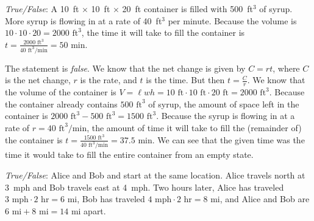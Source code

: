 \documentclass[11pt,letterpaper]{article}
\begin{document}
\quizsol \textit{True/False}: A 10~ft $\times$ 10~ft $\times$ 20~ft container is filled with 500~ft$^3$ of syrup. More syrup is flowing in at a rate of 40~ft$^3$ per minute. Because the volume is $10 \cdot 10 \cdot 20= 2000 \text{ ft}^3$, the time it will take to fill the container is $t= \frac{2000 \text{ ft}^3}{40 \text{ ft}^3/\text{min}}= 50 \text{ min}$. \pspace

\sol The statement is \textit{false}. We know that the net change is given by $C= rt$, where $C$ is the net change, $r$ is the rate, and $t$ is the time. But then $t= \frac{C}{r}$. We know that the volume of the container is $V= \ell wh= 10 \text{ ft} \cdot 10 \text{ ft} \cdot 20 \text{ ft}= 2000 \text{ ft}^3$. Because the container already contains $500 \text{ ft}^3$ of syrup, the amount of space left in the container is $2000 \text{ ft}^3 - 500 \text{ ft}^3= 1500 \text{ ft}^3$. Because the syrup is flowing in at a rate of $r= 40 \text{ ft}^3/\text{min}$, the amount of time it will take to fill the (remainder of) the container is $t= \frac{1500 \text{ ft}^3}{40 \text{ ft}^3/\text{min}}= 37.5 \text{ min}$. We can see that the given time was the time it would take to fill the entire container from an empty state. \pvspace{1.3cm}



\quizsol \textit{True/False}: Alice and Bob and start at the same location. Alice travels north at 3~mph and Bob travels east at 4~mph. Two hours later, Alice has traveled $3 \text{ mph} \cdot 2 \text{ hr}= 6 \text{ mi}$, Bob has traveled $4 \text{ mph} \cdot 2 \text{ hr}= 8 \text{ mi}$, and Alice and Bob are $6 \text{ mi} + 8 \text{ mi}= 14 \text{ mi}$ apart. \pspace
\end{document}
